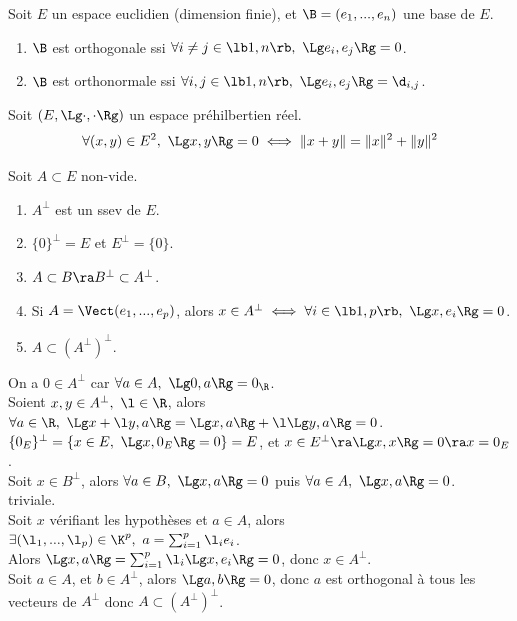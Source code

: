 \documentclass[11pt]{article}
\begin{document}
\vspace*{-0.8cm}

\begin{defi}{}{}
    Soit $E$ un espace euclidien (dimension finie), et $\B=(e_1,...,e_n)$ une base de $E$.
    \begin{enumerate}
        \item $\B$ est orthogonale ssi $\forall i\neq j \in \lb1,n\rb, ~ \Lg e_i, e_j \Rg = 0$.
        \item $\B$ est orthonormale ssi $\forall i, j \in \lb 1, n \rb, ~ \Lg e_i, e_j \Rg = \d_{i,j}$. 
    \end{enumerate}
\end{defi}

\vspace*{-0.8cm}

\begin{thm}{}{}
    Soit $(E,\Lg\cdot,\cdot\Rg)$ un espace préhilbertien réel.
    \begin{equation*}
        \forall (x, y) \in E^2, ~ \Lg x, y \Rg = 0 \iff \| x + y \| = \| x \|^2 + \| y \|^2
    \end{equation*}
\end{thm}

\vspace*{-0.8cm}

\begin{thm}{}{}
    Soit $A\subset E$ non-vide.
    \begin{enumerate}
        \item $A^\bot$ est un ssev de $E$.
        \item $\{0\}^\bot = E$ et $E^\bot = \{0\}$.
        \item $A\subset B \ra B^\bot \subset A^\bot$.
        \item Si $A=\Vect(e_1,...,e_p)$, alors $x\in A^\bot \iff \forall i \in \lb1,p\rb, ~ \Lg x, e_i \Rg = 0$.
        \item $A\subset \left(A^\bot\right)^\bot$.
    \end{enumerate}
    \tcblower
     On a $0\in A^\bot$ car $\forall a \in A, ~ \Lg 0, a\Rg = 0_\R$.\\
    Soient $x,y \in A^\bot, ~ \l \in \R$, alors $\forall a \in \R, ~ \Lg x + \l y, a \Rg = \Lg x, a \Rg + \l \Lg y, a \Rg = 0$.\\
     $\{0_E\}^\bot = \{ x \in E, ~ \Lg x,0_E\Rg = 0 \} = E$, et $x\in E^\bot \ra \Lg x,x\Rg = 0 \ra x=0_E$.\\
     Soit $x\in B^\bot$, alors $\forall a \in B, ~ \Lg x,a\Rg = 0$ puis $\forall a \in A, ~ \Lg x, a \Rg = 0$.\\
     triviale.\\
     Soit $x$ vérifiant les hypothèses et $a\in A$, alors $\exists (\l_1,...,\l_p)\in\K^p, ~ a=\sum_{i=1}^p \l_i e_i$.\\
    Alors $\Lg x,a\Rg = \sum_{i=1}^p \l_i\Lg x,e_i\Rg=0$, donc $x\in A^\bot$.\\
     Soit $a\in A$, et $b\in A^\bot$, alors $\Lg a, b \Rg = 0$, donc $a$ est orthogonal à tous les vecteurs de $A^\bot$ donc $A\subset (A^\bot)^\bot$.
\end{thm}
\end{document}
